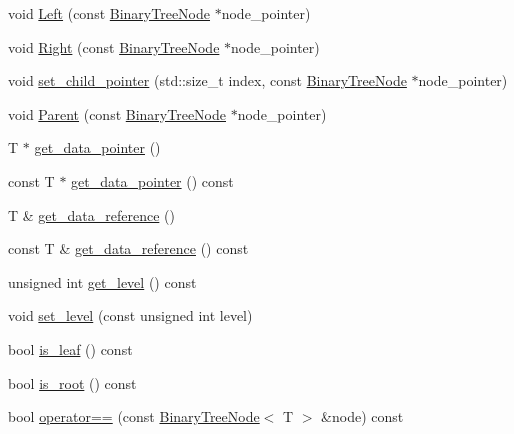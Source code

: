 \begin{DoxyCompactItemize}
\item 
void \hyperlink{classBinaryTreeNode_aa645c65bfa4702e04c97d70c37632a17}{Left} (const \hyperlink{classBinaryTreeNode}{Binary\+Tree\+Node} $\ast$node\+\_\+pointer)
\item 
void \hyperlink{classBinaryTreeNode_add14f066fd229ef84f334110ebc0061f}{Right} (const \hyperlink{classBinaryTreeNode}{Binary\+Tree\+Node} $\ast$node\+\_\+pointer)
\item 
void \hyperlink{classBinaryTreeNode_a37f0dd5197e454f14e3e99c85ab516eb}{set\+\_\+child\+\_\+pointer} (std\+::size\+\_\+t index, const \hyperlink{classBinaryTreeNode}{Binary\+Tree\+Node} $\ast$node\+\_\+pointer)
\item 
void \hyperlink{classBinaryTreeNode_abd72fc34f46fb41abdf9a692b4db0cdd}{Parent} (const \hyperlink{classBinaryTreeNode}{Binary\+Tree\+Node} $\ast$node\+\_\+pointer)
\item 
T $\ast$ \hyperlink{classBinaryTreeNode_aee6acddfb9686de160994b81a32faa80}{get\+\_\+data\+\_\+pointer} ()
\item 
const T $\ast$ \hyperlink{classBinaryTreeNode_acb9eb20251b6fdde199264527499c9ca}{get\+\_\+data\+\_\+pointer} () const
\item 
T \& \hyperlink{classBinaryTreeNode_ad24220a78b219a242dc66be86cf6ddd9}{get\+\_\+data\+\_\+reference} ()
\item 
const T \& \hyperlink{classBinaryTreeNode_a6bfbb8840c8a263ffcaacb0b7b61170c}{get\+\_\+data\+\_\+reference} () const
\item 
unsigned int \hyperlink{classBinaryTreeNode_aa89de0a58ae53ae5eb701bec3adc880a}{get\+\_\+level} () const
\item 
void \hyperlink{classBinaryTreeNode_ae420da1d4c6a4ac054cd181535e718f2}{set\+\_\+level} (const unsigned int level)
\item 
bool \hyperlink{classBinaryTreeNode_a9ef9e129737446b961cafd353b0a7370}{is\+\_\+leaf} () const
\item 
bool \hyperlink{classBinaryTreeNode_a7f24a34754ef61fb41004606a26cc7e1}{is\+\_\+root} () const
\item 
bool \hyperlink{classBinaryTreeNode_a0a362a295603c8dfffb45663e3c89507}{operator==} (const \hyperlink{classBinaryTreeNode}{Binary\+Tree\+Node}$<$ T $>$ \&node) const
\end{DoxyCompactItemize}

